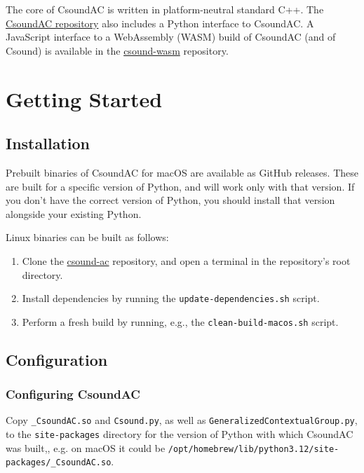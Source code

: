 \documentclass[letterpaper,10pt,DIV=12,parskip=half]{scrartcl}
\begin{document}
\noindent The core of CsoundAC is written in platform-neutral standard C++. The \href{https://github.com/gogins/csound-ac}{CsoundAC repository} also includes a Python interface to CsoundAC. A JavaScript interface to a WebAssembly (WASM) build of CsoundAC (and of Csound) is available in the \href{https://github.com/gogins/csound-wasm}{csound-wasm} repository. 

\section{Getting Started}

\subsection{Installation}

Prebuilt binaries of CsoundAC for macOS are available as GitHub releases. These are built for a specific version of Python, and will work only with that version. If you don't have the correct version of Python, you should install that version alongside your existing Python. 

Linux binaries can be built as follows:

\begin{enumerate}
\item Clone the \href{https://github.com/gogins/csound-ac}{csound-ac} repository, and open a terminal in the repository's root directory.
\item Install dependencies by running the \lstinline{update-dependencies.sh} script.
\item Perform a fresh build by running, e.g., the \lstinline{clean-build-macos.sh} script.
\end{enumerate}

\subsection{Configuration}

\subsubsection{Configuring CsoundAC}

Copy  \lstinline{_CsoundAC.so} and \lstinline{Csound.py}, as well as \lstinline{GeneralizedContextualGroup.py}, to the \lstinline{site-packages} directory for the version of Python with which CsoundAC was built,, e.g. on macOS it could be \lstinline|/opt/homebrew/lib/python3.12/site-packages/_CsoundAC.so|.
\end{document}
